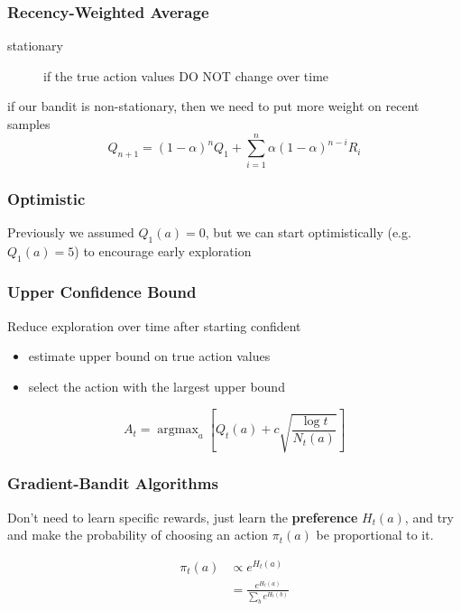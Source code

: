 \documentclass[]{article}
\theoremstyle{definition}
\DeclareMathOperator*{\argmax}{argmax}
\begin{document}
\subsubsection{Recency-Weighted Average}
\label{ssub:recency_weighted_average}

\begin{description}
    \item[stationary] if the true action values DO NOT change over time
\end{description}

if our bandit is non-stationary, then we need to put more weight on recent samples
\begin{equation*}
    Q_{n+1} = (1 - \alpha)^n Q_1 + \sum_{i=1}^n \alpha(1 - \alpha)^{n - i} R_i
\end{equation*}

\subsubsection{Optimistic}
\label{ssub:optimistic}
Previously we assumed $Q_1(a) = 0$, but we can start optimistically (e.g. $Q_1(a) = 5$) to encourage early exploration

\subsubsection{Upper Confidence Bound}
\label{ssub:upper_confidence_bound}
Reduce exploration over time after starting confident
\begin{itemize}
    \item estimate upper bound on true action values
    \item select the action with the largest upper bound
\end{itemize}

\begin{equation*}
    A_t = \argmax_a [Q_t(a) + c \sqrt{\frac{\log t}{N_t(a)}}]
\end{equation*}

\subsubsection{Gradient-Bandit Algorithms}
\label{ssub:gradient_bandit_algorithms}

Don't need to learn specific rewards, just learn the \textbf{preference} $H_t(a)$, and try and make the probability of choosing an action $\pi_t(a)$ be proportional to it.

\begin{eqnarray*}
    \pi_t(a) &\propto e^{H_t(a)} \\
             &= \frac{e^{H_t(a)}}{\sum_b e^{H_t(b)}}
\end{eqnarray*}
\end{document}
